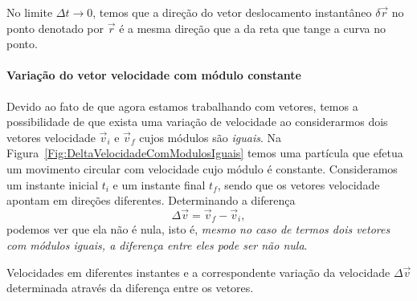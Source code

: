 \begin{marginfigure}[-1cm]
\caption{No limite $\Delta t \to 0$, temos que a direção do vetor deslocamento instantâneo $\delta\vec{r}$ no ponto denotado por $\vec{r}$ é a mesma direção que a da reta que tange a curva no ponto.\label{Fig:Dir_vel}}
\end{marginfigure}

\paragraph{Variação do vetor velocidade com módulo constante}

Devido ao fato de que agora estamos trabalhando com vetores, temos a possibilidade de que exista uma variação de velocidade ao considerarmos dois vetores velocidade $\vec{v}_i$ e $\vec{v}_f$ cujos módulos são \emph{iguais}. Na Figura~\ref{Fig:DeltaVelocidadeComModulosIguais} temos uma partícula que efetua um movimento circular com velocidade cujo módulo é constante. Consideramos um instante inicial $t_i$ e um instante final $t_f$, sendo que os vetores velocidade apontam em direções diferentes. Determinando a diferença
\begin{equation}
	\Delta \vec{v} = \vec{v}_f - \vec{v}_i,
\end{equation}
%
podemos ver que ela não é nula, isto é, \emph{mesmo no caso de termos dois vetores com módulos iguais, a diferença entre eles pode ser não nula}.

\begin{marginfigure}
   \caption{Velocidades em diferentes instantes e a correspondente variação da velocidade $\Delta\vec{v}$ determinada através da diferença entre os vetores. \label{Fig:DeltaVelocidadeComModulosIguais}}
\end{marginfigure}

